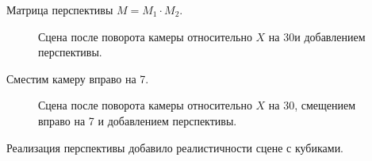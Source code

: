 \documentclass[a5paper, 10pt]{article}
\theoremstyle{definition}
\theoremstyle{plain}
\theoremstyle{remark}
\begin{document}
Матрица перспективы $M = M_1 \cdot M_2$.
\begin{figure}[h!]
\caption{Сцена после поворота камеры относительно  $X$ на $30$\textdegree и добавлением перспективы.}
\end{figure}
\newpage
Сместим камеру вправо на 7.
\begin{figure}[h!]
\caption{Сцена после поворота камеры относительно  $X$ на $30$\textdegree, смещением вправо на 7 и добавлением перспективы.}
\end{figure}

Реализация перспективы добавило реалистичности сцене с кубиками.
\end{document}

